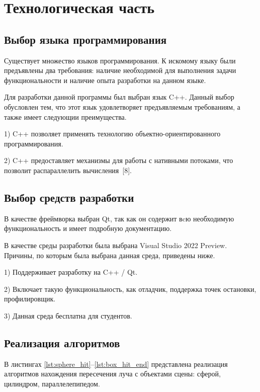 \chapter{Технологическая часть}

\section{Выбор языка программирования}

Существует множество языков программирования. К искомому языку были предъявлены два требования: наличие необходимой для выполнения задачи функциональности и наличие опыта разработки на данном языке.

Для разработки данной программы был выбран язык C++. Данный выбор обусловлен тем, что этот язык удовлетворяет предъявляемым требованиям, а также имеет  следующии преимущества.

1)	C++ позволяет применять технологию объектно-ориентированного программирования.

2) C++ предоставляет механизмы для работы с нативными потоками, что позволит распараллелить вычисления~[8].

\section{Выбор средств разработки}

В качестве фреймворка выбран Qt, так как он содержит вcю необходимую функциональность и имеет подробную документацию.

В качестве среды разработки была выбрана Visual Studio 2022 Preview. Причины, по которым была выбрана данная среда, приведены ниже.

1)	Поддерживает разработку на C++ / Qt.

2)  Включает такую функциональность, как отладчик, поддержка точек остановки, профилировщик.

3)	Данная среда бесплатна для студентов.


\section{Реализация алгоритмов}

В листингах \ref{lst:sphere_hit}--\ref{lst:box_hit_end} представлена реализация алгоритмов нахождения пересечения луча с объектами сцены: сферой, цилиндром, параллелепипедом.

